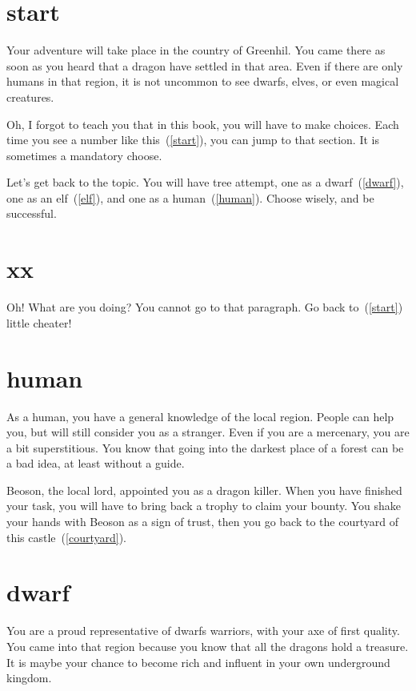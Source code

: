 \section{start}

Your adventure will take place in the country of Greenhil. You came there as soon
as you heard that a dragon have settled in that area. Even if there are only
humans in that region, it is not uncommon to see dwarfs, elves, or even magical
creatures.

Oh, I forgot to teach you that in this book, you will have to make choices. Each
time you see a number like this~(\ref{start}), you can jump to that section.
It is sometimes a mandatory choose.

Let's get back to the topic. You will have tree attempt, one as a
dwarf~(\ref{dwarf}), one as an elf~(\ref{elf}), and one as a
human~(\ref{human}). Choose wisely, and be successful.

\section{xx}

Oh! What are you doing? You cannot go to that paragraph. Go back
to~(\ref{start}) little cheater!

\section{human}

As a human, you have a general knowledge of the local region. People can help
you, but will still consider you as a stranger. Even if you are a mercenary, you
are a bit superstitious. You know that going into the darkest place of a forest
can be a bad idea, at least without a guide.

Beoson, the local lord, appointed you as a dragon killer. When you have finished
your task, you will have to bring back a trophy to claim your bounty. You shake
your hands with Beoson as a sign of trust, then you go back to the courtyard of
this castle~(\ref{courtyard}).

\section{dwarf}

You are a proud representative of dwarfs warriors, with your axe of first
quality. You came into that region because you know that all the dragons hold a
treasure. It is maybe your chance to become rich and influent in your own
underground kingdom.

